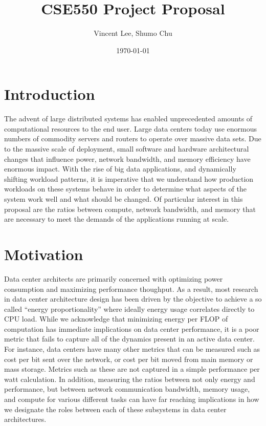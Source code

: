 \documentclass{article}
\begin{document}
\title{CSE550 Project Proposal}
\author{Vincent Lee, Shumo Chu}
\date{\today}

\maketitle


\section{Introduction}

The advent of large distributed systems has enabled unprecedented amounts of computational resources to the end user.
Large data centers today use enormous numbers of commodity servers and routers to operate over massive data sets.
Due to the massive scale of deployment, small software and hardware architectural changes that influence power, network bandwidth, and memory efficiency have enormous impact.
With the rise of big data applications, and dynamically shifting workload patterns, it is imperative that we understand how production workloads on these systems behave in order to determine what aspects of the system work well and what should be changed.
Of particular interest in this proposal are the ratios between compute, network bandwidth, and memory that are necessary to meet the demands of the applications running at scale.


\section{Motivation}

Data center architects are primarily concerned with optimizing power consumption and maximizing performance thoughput.
As a result, most research in data center architecture design has been driven by the objective to achieve a so called ``energy proportionality'' where ideally energy usage correlates directly to CPU load. 
While we acknowledge that minimizing energy per FLOP of computation has immediate implications on data center performance, it is a poor metric that fails to capture all of the dynamics present in an active data center.
For instance, data centers have many other metrics that can be measured such as cost per bit sent over the network, or cost per bit moved from main memory or mass storage.
Metrics such as these are not captured in a simple performance per watt calculation.
In addition, measuring the ratios between not only energy and performance, but between network communication bandwidth, memory usage, and compute for various different tasks can have far reaching implications in how we designate the roles between each of these subsystems in data center architectures.
\end{document}
